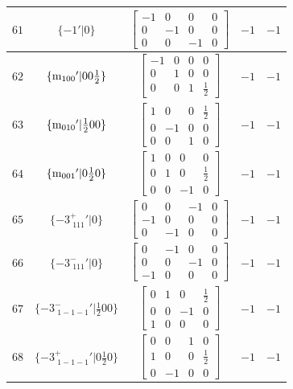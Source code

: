 \documentclass[fleqn,8pt]{jsarticle}
\begin{document}
\begin{longtable}{ccccc}
$ 61 $ & $ \{-1{}'|0\} $ & $ \begin{bmatrix} -1 & 0 & 0 & 0 \\ 0 & -1 & 0 & 0 \\ 0 & 0 & -1 & 0 \end{bmatrix} $ & $ -1 $ & $ -1 $ \\ \hline
$ 62 $ & $ \{{\rm m}_{100}{}'|0 0 \frac{1}{2}\} $ & $ \begin{bmatrix} -1 & 0 & 0 & 0 \\ 0 & 1 & 0 & 0 \\ 0 & 0 & 1 & \frac{1}{2} \end{bmatrix} $ & $ -1 $ & $ -1 $ \\ \hline
$ 63 $ & $ \{{\rm m}_{010}{}'|\frac{1}{2} 0 0\} $ & $ \begin{bmatrix} 1 & 0 & 0 & \frac{1}{2} \\ 0 & -1 & 0 & 0 \\ 0 & 0 & 1 & 0 \end{bmatrix} $ & $ -1 $ & $ -1 $ \\ \hline
$ 64 $ & $ \{{\rm m}_{001}{}'|0 \frac{1}{2} 0\} $ & $ \begin{bmatrix} 1 & 0 & 0 & 0 \\ 0 & 1 & 0 & \frac{1}{2} \\ 0 & 0 & -1 & 0 \end{bmatrix} $ & $ -1 $ & $ -1 $ \\ \hline
$ 65 $ & $ \{-3^{+}_{\,\,111}{}'|0\} $ & $ \begin{bmatrix} 0 & 0 & -1 & 0 \\ -1 & 0 & 0 & 0 \\ 0 & -1 & 0 & 0 \end{bmatrix} $ & $ -1 $ & $ -1 $ \\ \hline
$ 66 $ & $ \{-3^{-}_{\,\,111}{}'|0\} $ & $ \begin{bmatrix} 0 & -1 & 0 & 0 \\ 0 & 0 & -1 & 0 \\ -1 & 0 & 0 & 0 \end{bmatrix} $ & $ -1 $ & $ -1 $ \\ \hline
$ 67 $ & $ \{-3^{-}_{\,\,1-1-1}{}'|\frac{1}{2} 0 0\} $ & $ \begin{bmatrix} 0 & 1 & 0 & \frac{1}{2} \\ 0 & 0 & -1 & 0 \\ 1 & 0 & 0 & 0 \end{bmatrix} $ & $ -1 $ & $ -1 $ \\ \hline
$ 68 $ & $ \{-3^{+}_{\,\,1-1-1}{}'|0 \frac{1}{2} 0\} $ & $ \begin{bmatrix} 0 & 0 & 1 & 0 \\ 1 & 0 & 0 & \frac{1}{2} \\ 0 & -1 & 0 & 0 \end{bmatrix} $ & $ -1 $ & $ -1 $ \\ \hline

\end{longtable}
\end{document}
